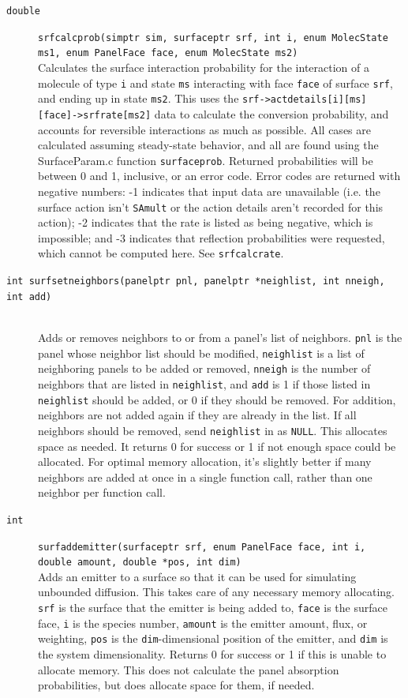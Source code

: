\documentclass {scrbook}
\newcommand {\ttt} {\texttt}
\begin{document}
\begin{description}
\item[\ttt{double}]
\ttt{srfcalcprob(simptr sim, surfaceptr srf, int i, enum MolecState ms1, enum PanelFace face, enum MolecState ms2)}
\hfill \\
Calculates the surface interaction probability for the interaction of a molecule of type \ttt{i} and state \ttt{ms} interacting with face \ttt{face} of surface \ttt{srf}, and ending up in state \ttt{ms2}. This uses the \ttt{srf->actdetails[i][ms][face]->srfrate[ms2]} data to calculate the conversion probability, and accounts for reversible interactions as much as possible. All cases are calculated assuming steady-state behavior, and all are found using the SurfaceParam.c function \ttt{surfaceprob}. Returned probabilities will be between 0 and 1, inclusive, or an error code. Error codes are returned with negative numbers: -1 indicates that input data are unavailable (i.e. the surface action isn't \ttt{SAmult} or the action details aren't recorded for this action); -2 indicates that the rate is listed as being negative, which is impossible; and -3 indicates that reflection probabilities were requested, which cannot be computed here. See \ttt{srfcalcrate}.

\item[\ttt{int surfsetneighbors(panelptr pnl, panelptr *neighlist, int nneigh, int add)}]
\hfill \\
Adds or removes neighbors to or from a panel's list of neighbors. \ttt{pnl} is the panel whose neighbor list should be modified, \ttt{neighlist} is a list of neighboring panels to be added or removed, \ttt{nneigh} is the number of neighbors that are listed in \ttt{neighlist}, and \ttt{add} is 1 if those listed in \ttt{neighlist} should be added, or 0 if they should be removed. For addition, neighbors are not added again if they are already in the list. If all neighbors should be removed, send \ttt{neighlist} in as \ttt{NULL}. This allocates space as needed. It returns 0 for success or 1 if not enough space could be allocated. For optimal memory allocation, it's slightly better if many neighbors are added at once in a single function call, rather than one neighbor per function call.

\item[\ttt{int}]
\ttt{surfaddemitter(surfaceptr srf, enum PanelFace face, int i, double amount, double *pos, int dim)}
\hfill \\
Adds an emitter to a surface so that it can be used for simulating unbounded diffusion. This takes care of any necessary memory allocating. \ttt{srf} is the surface that the emitter is being added to, \ttt{face} is the surface face, \ttt{i} is the species number, \ttt{amount} is the emitter amount, flux, or weighting, \ttt{pos} is the \ttt{dim}-dimensional position of the emitter, and \ttt{dim} is the system dimensionality. Returns 0 for success or 1 if this is unable to allocate memory. This does not calculate the panel absorption probabilities, but does allocate space for them, if needed.


\end{description}
\end{document}
